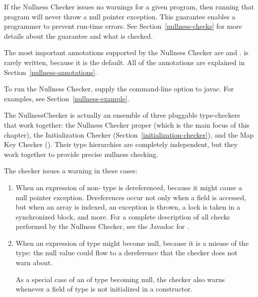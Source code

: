 \htmlhr
{}

If the Nullness Checker issues no warnings for a given program, then
running that program will never throw a null pointer exception.  This
guarantee enables a programmer to prevent run-time errors.
See Section~\ref{nullness-checks} for more details about
the guarantee and what is checked.

The most important annotations supported by the Nullness Checker are
 and
.
 is rarely written, because it is
the default.  All of the annotations are explained in
Section~\ref{nullness-annotations}.

To run the Nullness Checker, supply the
command-line option to javac.  For
examples, see Section~\ref{nullness-example}.

The NullnessChecker is actually an ensemble of three pluggable
type-checkers that work together: the Nullness Checker proper (which is the
main focus of this chapter), the Initialization Checker
(Section~\ref{initialization-checker}), and the Map Key Checker
().
Their type hierarchies are completely independent, but they work together
to provide precise nullness checking.



The checker issues a warning in these cases:

\begin{enumerate}

\item
  When an expression of non- type
  is dereferenced, because it might cause a null pointer exception.
  Dereferences occur not only when a field is accessed, but when an array
  is indexed, an exception is thrown, a lock is taken in a synchronized
  block, and more.  For a complete description of all checks performed by
  the Nullness Checker, see the Javadoc for
  .

\item
  When an expression of  type
  might become null, because it
  is a misuse of the type:  the null value could flow to a dereference that
  the checker does not warn about.

  As a special case of an of 
  type becoming null, the checker also warns whenever a field of
   type is not initialized in a
  constructor.

\end{enumerate}

